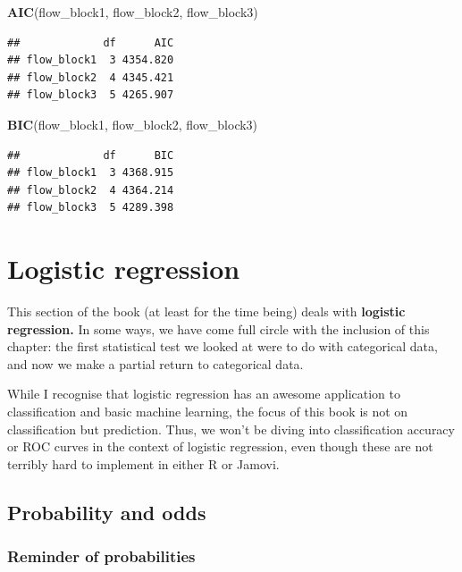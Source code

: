 \documentclass[
]{book}
\newenvironment{Shaded}{\begin{snugshade}}{\end{snugshade}}
\newcommand{\FunctionTok}[1]{\textcolor[rgb]{0.13,0.29,0.53}{\textbf{#1}}}
\newcommand{\NormalTok}[1]{#1}
\begin{document}
\begin{Shaded}
\begin{Highlighting}[]
\FunctionTok{AIC}\NormalTok{(flow\_block1, flow\_block2, flow\_block3)}
\end{Highlighting}
\end{Shaded}

\begin{verbatim}
##             df      AIC
## flow_block1  3 4354.820
## flow_block2  4 4345.421
## flow_block3  5 4265.907
\end{verbatim}

\begin{Shaded}
\begin{Highlighting}[]
\FunctionTok{BIC}\NormalTok{(flow\_block1, flow\_block2, flow\_block3)}
\end{Highlighting}
\end{Shaded}

\begin{verbatim}
##             df      BIC
## flow_block1  3 4368.915
## flow_block2  4 4364.214
## flow_block3  5 4289.398
\end{verbatim}

\chapter{Logistic regression}\label{logistic-regression}

This section of the book (at least for the time being) deals with \textbf{logistic regression.} In some ways, we have come full circle with the inclusion of this chapter: the first statistical test we looked at were to do with categorical data, and now we make a partial return to categorical data.

While I recognise that logistic regression has an awesome application to classification and basic machine learning, the focus of this book is not on classification but prediction. Thus, we won't be diving into classification accuracy or ROC curves in the context of logistic regression, even though these are not terribly hard to implement in either R or Jamovi.

\section{Probability and odds}\label{probability-and-odds}

\subsection{Reminder of probabilities}\label{reminder-of-probabilities}
\end{document}
